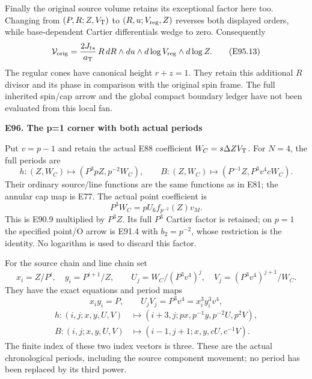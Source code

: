 Finally the original source volume retains its
exceptional factor here too. Changing from
\((P,R;Z,V_{\rm T})\) to
\((R,u;V_{\rm reg},Z)\) reverses both displayed
orders, while base-dependent Cartier differentials
wedge to zero. Consequently
\[
 \mathcal V_{\rm orig}
  =\frac{2J_{ts}}{a_{\rm T}}\,R\,
        dR\wedge du\wedge d\log V_{\rm reg}
                         \wedge d\log Z.       \tag{E95.13}
\]
The regular cones have canonical height \(r+z=1\).
They retain this additional \(R\) divisor and its
phase in comparison with the original spin frame.
The full inherited spin/cap arrow and the global
compact boundary ledger have not been evaluated
from this local fan.

\par

\medskip\noindent\textbf{E96. The p=1 corner with both actual periods}

\par\nobreak

Put \(v=p-1\) and retain the actual E88 coefficient
\(W_C=s\Delta ZV_{\rm T}\). For \(N=4\), the full
periods are
\[
 h:(Z,W_C)\longmapsto(P^3pZ,p^{-2}W_C),\qquad
 B:(Z,W_C)\longmapsto(P^{-1}Z,P^3v^4cW_C).
 \tag{E96.1}
\]
Their ordinary source/line functions are the same
functions as in E81; the annular cap map is E77.
The actual point coefficient is
\[
 P^3W_C=pU_6 f_{p^{-2}}(Z)v_M.                 \tag{E96.2}
\]
This is E90.9 multiplied by \(P^3Z\).
Its full \(P^3\) Cartier factor is retained; on
\(p=1\) the specified point/O arrow is E91.4 with
\(b_2=p^{-2}\), whose restriction is the identity.
No logarithm is used to discard this factor.

For the source chain and line chain set
\[
 x_i=Z/P^i,\quad y_i=P^{i+1}/Z,\qquad
 U_j=W_C/(P^3v^4)^j,\quad
 V_j=(P^3v^4)^{j+1}/W_C.
\]
They have the exact equations and period maps
\[
 x_iy_i=P,\qquad U_jV_j=P^3v^4=x_i^3y_i^3v^4,
 \tag{E96.3}
\]
\[
\begin{aligned}
 h:(i,j;x,y,U,V)&\longmapsto
     (i+3,j;px,p^{-1}y,p^{-2}U,p^2V),\\
 B:(i,j;x,y,U,V)&\longmapsto
     (i-1,j+1;x,y,cU,c^{-1}V).
\end{aligned}                                                   \tag{E96.4}
\]
The finite index of these two index vectors is three.
These are the actual chronological periods, including
the source component movement; no period has been
replaced by its third power.

